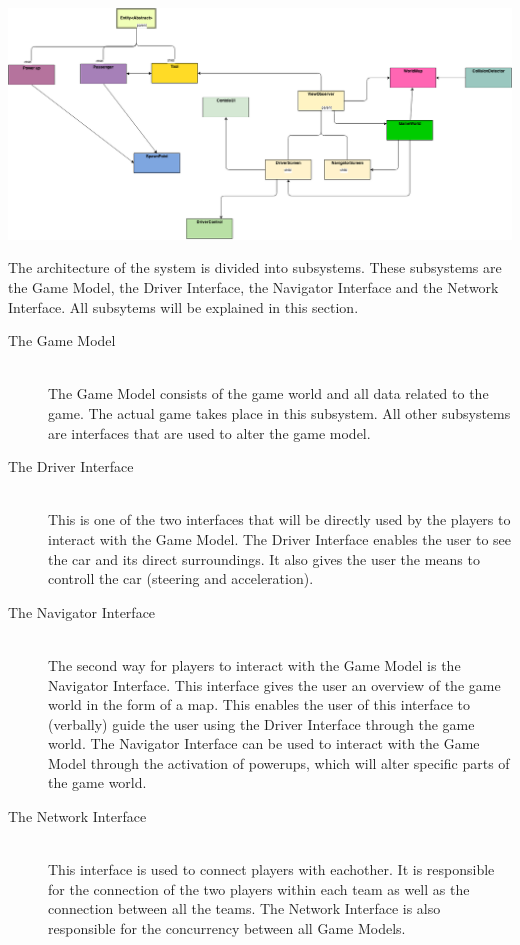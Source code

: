 
\begin{center}
	 \includegraphics[width=180mm]{./images/UML4.png}

\end{center}


The architecture of the system is divided into subsystems. These subsystems are the Game Model, the Driver Interface, the Navigator Interface and the Network Interface. All subsytems will be explained in this section.

\begin{description}
	
\item[The Game Model] \hfill \\
The Game Model consists of the game world and all data related to the game. The actual game takes place in this subsystem. All other subsystems are interfaces that are used to alter the game model.

\item[The Driver Interface]  \hfill \\
This is one of the two interfaces that will be directly used by the players to interact with the Game Model. The Driver Interface enables the user to see the car and its direct surroundings. It also gives the user the means to controll the car (steering and acceleration). 

\item[The Navigator Interface]  \hfill \\
The second way for players to interact with the Game Model is the Navigator Interface. This interface gives the user an overview of the game world in the form of a map. This enables the user of this interface to (verbally) guide the user using the Driver Interface through the game world. The Navigator Interface can be used to interact with the Game Model through the activation of powerups, which will alter specific parts of the game world.

\item[The Network Interface]  \hfill \\
This interface is used to connect players with eachother. It is responsible for the connection of the two players within each team as well as the connection between all the teams. The Network Interface is also responsible for the concurrency between all Game Models.

\end{description}
